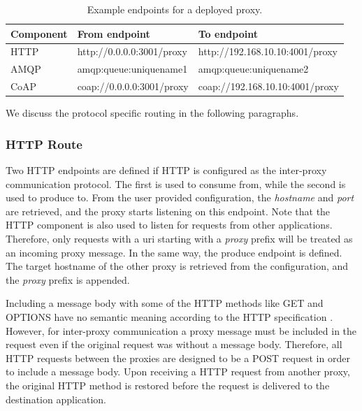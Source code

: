 \begin{table}[h]
\begin{tabular}{|l|l|l|}
\hline
\textbf{Component} & \textbf{From endpoint} & \textbf{To endpoint}       \\ \hline
HTTP               & http://0.0.0.0:3001/proxy & http://192.168.10.10:4001/proxy \\ \hline
AMQP               & amqp:queue:uniquename1    & amqp:queue:uniquename2          \\ \hline
CoAP               & coap://0.0.0.0:3001/proxy & coap://192.168.10.10:4001/proxy \\ \hline
\end{tabular}
\caption{Example endpoints for a deployed proxy.}
\label{table:example-endpoints}
\end{table}



We discuss the protocol specific routing in the following paragraphs.

\subsubsection{HTTP Route}

Two HTTP endpoints are defined if HTTP is configured as the inter-proxy
communication protocol. The first is used to consume from, while the second is
used to produce to. From the user provided configuration, the \textit{hostname}
and \textit{port} are retrieved, and the proxy starts listening on this
endpoint. Note that the HTTP component is also used to listen for requests from
other applications. Therefore, only requests with a \gls{uri} starting with a
\textit{proxy} prefix will be treated as an incoming proxy message. In the same
way, the produce endpoint is defined. The target hostname of the other proxy is
retrieved from the configuration, and the \textit{proxy} prefix is appended.

Including a message body with some of the HTTP methods like GET and OPTIONS have
no semantic meaning according to the HTTP specification \cite{rfc-2616}.
However, for inter-proxy communication a proxy message must be included in the
request even if the original request was without a message body. Therefore, all
HTTP requests between the proxies are designed to be a POST request in order to
include a message body. Upon receiving a HTTP request from another proxy, the
original HTTP method is restored before the request is delivered to the
destination application.

